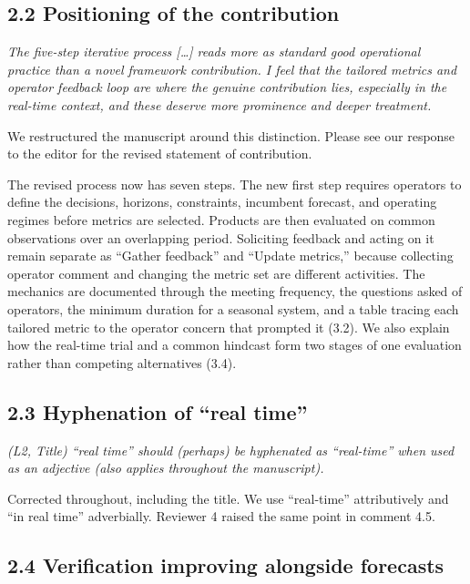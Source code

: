 \documentclass[11pt]{article}
\newenvironment{rc}%
  {\begin{list}{}{\setlength{\leftmargin}{1.5em}\setlength{\rightmargin}{1.5em}%
   \setlength{\topsep}{0.2em}\setlength{\parsep}{0pt}\setlength{\itemsep}{0pt}}%
   \item[]\itshape\color{quotegray}}%
  {\end{list}}
\begin{document}
\subsection*{2.2 Positioning of the contribution}

\begin{rc}
The five-step iterative process [\ldots] reads more as standard good operational practice
than a novel framework contribution. I feel that the tailored metrics and operator
feedback loop are where the genuine contribution lies, especially in the real-time
context, and these deserve more prominence and deeper treatment.
\end{rc}

We restructured the manuscript around this distinction. Please see our response to the editor
for the revised statement of contribution.

The revised process now has seven steps. The new first step requires operators to define the
decisions, horizons, constraints, incumbent forecast, and operating regimes before metrics are
selected. Products are then evaluated on common observations over an overlapping period.
Soliciting feedback and acting on it remain separate as ``Gather feedback'' and ``Update metrics,''
because collecting operator comment and changing the metric set are different activities. The
mechanics are documented through the meeting frequency, the questions asked of operators, the
minimum duration for a seasonal system, and a table tracing each tailored metric to the operator
concern that prompted it (3.2). We also explain how the real-time trial and a common hindcast form
two stages of one evaluation rather than competing alternatives (3.4).

\subsection*{2.3 Hyphenation of ``real time''}

\begin{rc}
(L2, Title) ``real time'' should (perhaps) be hyphenated as ``real-time'' when used as
an adjective (also applies throughout the manuscript).
\end{rc}

Corrected throughout, including the title. We use ``real-time'' attributively and ``in real
time'' adverbially. Reviewer 4 raised the same point in comment 4.5.

\subsection*{2.4 Verification improving alongside forecasts}
\end{document}
